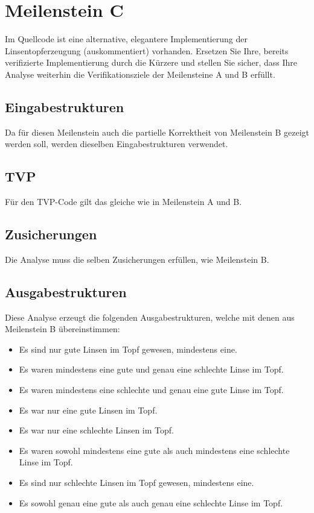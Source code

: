 \section{Meilenstein C}
Im Quellcode ist eine alternative, elegantere Implementierung der Linsentopferzeugung (auskommentiert) vorhanden. Ersetzen Sie Ihre, bereits verifizierte Implementierung durch die Kürzere und stellen Sie sicher, dass Ihre Analyse weiterhin die Verifikationsziele der Meilensteine A und B erfüllt.


\subsection{Eingabestrukturen}
Da für diesen Meilenstein auch die partielle Korrektheit von Meilenstein B gezeigt werden soll, werden dieselben Eingabestrukturen verwendet.


\subsection{TVP}
Für den TVP-Code gilt das gleiche wie in Meilenstein A und B.


\subsection{Zusicherungen}
Die Analyse muss die selben Zusicherungen erfüllen, wie Meilenstein B.


\subsection{Ausgabestrukturen}
Diese Analyse erzeugt die folgenden Ausgabestrukturen, welche mit denen aus Meilenstein B übereinstimmen:
\begin{itemize}[$\rightarrow$]
	\item Es sind nur gute Linsen im Topf gewesen, mindestens eine.
	\item Es waren mindestens eine gute und genau eine schlechte Linse im Topf.
	\item Es waren mindestens eine schlechte und genau eine gute Linse im Topf.
	\item Es war nur eine gute Linsen im Topf.
	\item Es war nur eine schlechte Linsen im Topf.
	\item Es waren sowohl mindestens eine gute als auch mindestens eine schlechte Linse im Topf.
	\item Es sind nur schlechte Linsen im Topf gewesen, mindestens eine.
	\item Es sowohl genau eine gute als auch genau eine schlechte Linse im Topf.
\end{itemize}